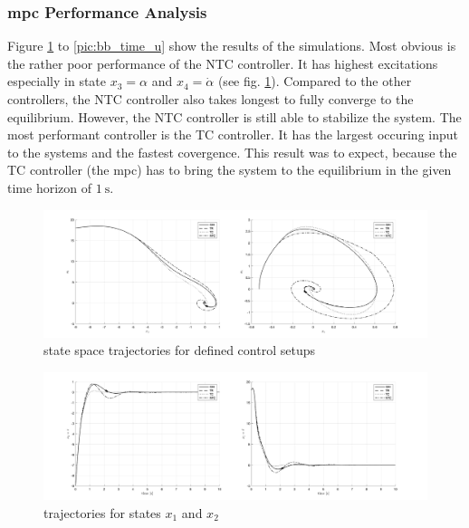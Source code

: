 \documentclass[10pt,a4paper,titlepage]{article}
\begin{document}
\subsubsection*{\gls{mpc} Performance Analysis}
Figure \ref{pic:bb_state_space} to \ref{pic:bb_time_u} show the results of the simulations. Most obvious is the rather poor performance of the NTC controller.
It has highest excitations especially in state $x_3 = \alpha$ and $x_4 = \dot{\alpha}$ (see fig. \ref{pic:bb_state_space}). Compared to the other controllers, the NTC controller also takes longest to fully converge to the equilibrium. However, the NTC controller is still able to
stabilize the system. The most performant controller is the TC controller. It has the largest occuring input to the systems  and the fastest covergence.
This result was to expect, because the TC controller (the \gls{mpc}) has to bring the system to the equilibrium in the given time horizon of $\SI{1}{\second}$. 

\begin{figure}[h]
	\begin{center}
		\includegraphics[width=\textwidth]{img/bb_states.png}
		\caption{state space trajectories for defined control setups}
		\label{pic:bb_state_space}
	\end{center}
\end{figure}

\begin{figure}[h!]
	\begin{center}
		\includegraphics[width=\textwidth]{img/bb_time_x1x2.png}
		\caption{trajectories for states $x_1$ and $x_2$}
		\label{pic:bb_time_x1x2}
	\end{center}
\end{figure}
\end{document}
